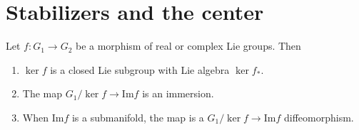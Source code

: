 \documentclass{report}
\begin{document}
\section{Stabilizers and the center}
\begin{corollary}
    Let $f: G_1 \to G_2$ be a morphism of real or complex Lie groups.
    Then 
    \begin{enumerate}[label = (\roman*)]
        \item $\ker f $ is a closed Lie subgroup with Lie algebra $\ker f_*$.
        \item The map $G_1/\ker f \to \mathrm{Im} f$ is an immersion.
        \item When $\mathrm{Im}f$ is a submanifold, the map is a $G_1/\ker f \to \mathrm{Im}f$ diffeomorphism.
    \end{enumerate}
\end{corollary}
\end{document}
